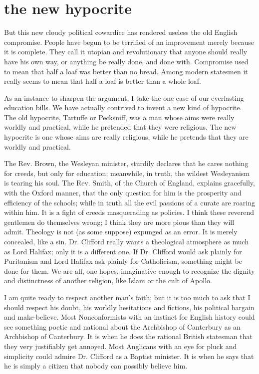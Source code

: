 \documentclass[final,10pt,letterpaper,twocolumn,openany]{book}
\begin{document}
\section{the new hypocrite}
But this new cloudy political cowardice has rendered useless the old
English compromise. People have begun to be terrified of an improvement
merely because it is complete. They call it utopian and revolutionary that
anyone should really have his own way, or anything be really done, and
done with. Compromise used to mean that half a loaf was better than no
bread. Among modern statesmen it really seems to mean that half a loaf is
better than a whole loaf.

    As an instance to sharpen the argument, I take the one case of our
everlasting education bills. We have actually contrived to invent a new
kind of hypocrite. The old hypocrite, Tartuffe or Pecksniff, was a man
whose aims were really worldly and practical, while he pretended that they
were religious. The new hypocrite is one whose aims are really religious,
while he pretends that they are worldly and practical. 

The Rev. Brown, the
Wesleyan minister, sturdily declares that he cares nothing for creeds, but
only for education; meanwhile, in truth, the wildest Wesleyanism is
tearing his soul. The Rev. Smith, of the Church of England, explains
gracefully, with the Oxford manner, that the only question for him is the
prosperity and efficiency of the schools; while in truth all the evil passions
of a curate are roaring within him. It is a fight of creeds masquerading as
policies. I think these reverend gentlemen do themselves wrong; I think
they are more pious than they will admit. Theology is not (as some
suppose) expunged as an error. It is merely concealed, like a sin. Dr.
Clifford really wants a theological atmosphere as much as Lord Halifax;
only it is a different one. If Dr. Clifford would ask plainly for Puritanism
and Lord Halifax ask plainly for Catholicism, something might be done
for them. We are all, one hopes, imaginative enough to recognize the
dignity and distinctness of another religion, like Islam or the cult of Apollo.

I am quite ready to respect another man's faith; but it is too much to ask
that I should respect his doubt, his worldly hesitations and fictions, his
political bargain and make-believe. Most Nonconformists with an instinct
for English history could see something poetic and national about the
Archbishop of Canterbury as an Archbishop of Canterbury. It is when he
does the rational British statesman that they very justifiably get annoyed.
Most Anglicans with an eye for pluck and simplicity could admire Dr.
Clifford as a Baptist minister. It is when he says that he is simply a citizen
that nobody can possibly believe him.
\end{document}
